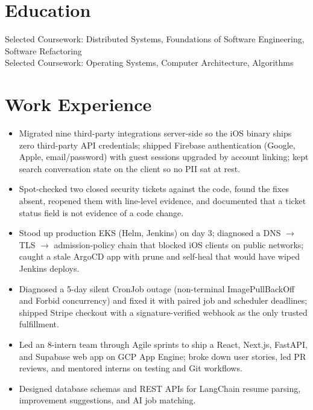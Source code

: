 \documentclass[11pt, letterpaper]{article}
\begin{document}

\section{Education}
Selected Coursework: Distributed Systems, Foundations of Software Engineering, Software Refactoring\\[1pt]
Selected Coursework: Operating Systems, Computer Architecture, Algorithms

\section{Work Experience}
\begin{itemize}
  \item Migrated nine third-party integrations server-side so the iOS binary ships zero third-party API credentials; shipped Firebase authentication (Google, Apple, email/password) with guest sessions upgraded by account linking; kept search conversation state on the client so no PII sat at rest.
  \item Spot-checked two closed security tickets against the code, found the fixes absent, reopened them with line-level evidence, and documented that a ticket status field is not evidence of a code change.
  \item Stood up production EKS (Helm, Jenkins) on day 3; diagnosed a DNS $\rightarrow$ TLS $\rightarrow$ admission-policy chain that blocked iOS clients on public networks; caught a stale ArgoCD app with prune and self-heal that would have wiped Jenkins deploys.
  \item Diagnosed a 5-day silent CronJob outage (non-terminal ImagePullBackOff and Forbid concurrency) and fixed it with paired job and scheduler deadlines; shipped Stripe checkout with a signature-verified webhook as the only trusted fulfillment.
\end{itemize}

\begin{itemize}
  \item Led an 8-intern team through Agile sprints to ship a React, Next.js, FastAPI, and Supabase web app on GCP App Engine; broke down user stories, led PR reviews, and mentored interns on testing and Git workflows.
  \item Designed database schemas and REST APIs for LangChain resume parsing, improvement suggestions, and AI job matching.
\end{itemize}
\end{document}

